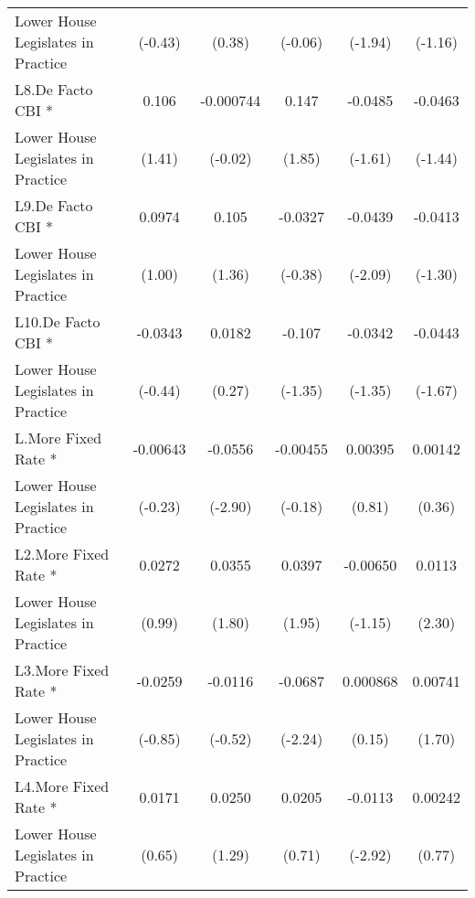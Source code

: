 {\begin{tabular}{l*{5}{c}}
Lower House Legislates in Practice&     (-0.43)         &      (0.38)         &     (-0.06)         &     (-1.94)         &     (-1.16)         \\
[1em]
L8.De Facto CBI *   &       0.106         &   -0.000744         &       0.147         &     -0.0485         &     -0.0463         \\
Lower House Legislates in Practice&      (1.41)         &     (-0.02)         &      (1.85)         &     (-1.61)         &     (-1.44)         \\
[1em]
L9.De Facto CBI *   &      0.0974         &       0.105         &     -0.0327         &     -0.0439\sym{*}  &     -0.0413         \\
Lower House Legislates in Practice&      (1.00)         &      (1.36)         &     (-0.38)         &     (-2.09)         &     (-1.30)         \\
[1em]
L10.De Facto CBI *  &     -0.0343         &      0.0182         &      -0.107         &     -0.0342         &     -0.0443         \\
Lower House Legislates in Practice&     (-0.44)         &      (0.27)         &     (-1.35)         &     (-1.35)         &     (-1.67)         \\
[1em]
L.More Fixed Rate * &    -0.00643         &     -0.0556\sym{**} &    -0.00455         &     0.00395         &     0.00142         \\
Lower House Legislates in Practice&     (-0.23)         &     (-2.90)         &     (-0.18)         &      (0.81)         &      (0.36)         \\
[1em]
L2.More Fixed Rate *&      0.0272         &      0.0355         &      0.0397         &    -0.00650         &      0.0113\sym{*}  \\
Lower House Legislates in Practice&      (0.99)         &      (1.80)         &      (1.95)         &     (-1.15)         &      (2.30)         \\
[1em]
L3.More Fixed Rate *&     -0.0259         &     -0.0116         &     -0.0687\sym{*}  &    0.000868         &     0.00741         \\
Lower House Legislates in Practice&     (-0.85)         &     (-0.52)         &     (-2.24)         &      (0.15)         &      (1.70)         \\
[1em]
L4.More Fixed Rate *&      0.0171         &      0.0250         &      0.0205         &     -0.0113\sym{**} &     0.00242         \\
Lower House Legislates in Practice&      (0.65)         &      (1.29)         &      (0.71)         &     (-2.92)         &      (0.77)         \\

\end{tabular}}
